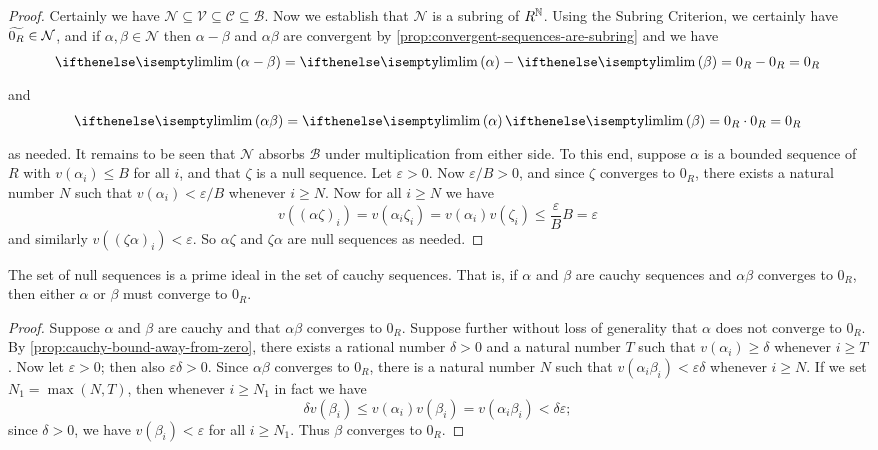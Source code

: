 \begin{proof}
Certainly we have \(\mathcal{N} \subseteq \mathcal{V} \subseteq \mathcal{C} \subseteq \mathcal{B}\).
Now we establish that \(\mathcal{N}\) is a subring of \(R^{\mathbb{N}}\).
Using the Subring Criterion, we certainly have \(\widetilde{0_R} \in \mathcal{N}\), and if \(\alpha,\beta \in \mathcal{N}\) then \(\alpha - \beta\) and \(\alpha\beta\) are convergent by \ref{prop:convergent-sequences-are-subring} and we have \[ \LIM{\alpha - \beta} = \LIM{\alpha} - \LIM{\beta} = 0_R - 0_R = 0_R \] and \[ \LIM{\alpha\beta} = \LIM{\alpha}\LIM{\beta} = 0_R \cdot 0_R = 0_R \] as needed.
It remains to be seen that \(\mathcal{N}\) absorbs \(\mathcal{B}\) under multiplication from either side.
To this end, suppose \(\alpha\) is a bounded sequence of \(R\) with \(v(\alpha_i) \leq B\) for all \(i\), and that \(\zeta\) is a null sequence.
Let \(\varepsilon > 0\).
Now \(\varepsilon/B > 0\), and since \(\zeta\) converges to \(0_R\), there exists a natural number \(N\) such that \(v(\alpha_i) < \varepsilon/B\) whenever \(i \geq N\).
Now for all \(i \geq N\) we have \[ v((\alpha\zeta)_i) = v(\alpha_i \zeta_i) = v(\alpha_i)v(\zeta_i) \leq \frac{\varepsilon}{B} B = \varepsilon \] and similarly \(v((\zeta\alpha)_i) < \varepsilon\).
So \(\alpha\zeta\) and \(\zeta\alpha\) are null sequences as needed.
\end{proof}

\begin{prop}
The set of null sequences is a prime ideal in the set of cauchy sequences.
That is, if \(\alpha\) and \(\beta\) are cauchy sequences and \(\alpha\beta\) converges to \(0_R\), then either \(\alpha\) or \(\beta\) must converge to \(0_R\).
\end{prop}

\begin{proof}
Suppose \(\alpha\) and \(\beta\) are cauchy and that \(\alpha\beta\) converges to \(0_R\).
Suppose further without loss of generality that \(\alpha\) does not converge to \(0_R\).
By \ref{prop:cauchy-bound-away-from-zero}, there exists a rational number \(\delta > 0\) and a natural number \(T\) such that \(v(\alpha_i) \geq \delta\) whenever \(i \geq T\).
Now let \(\varepsilon > 0\); then also \(\varepsilon\delta > 0\).
Since \(\alpha\beta\) converges to \(0_R\), there is a natural number \(N\) such that \(v(\alpha_i\beta_i) < \varepsilon\delta\) whenever \(i \geq N\).
If we set \(N_1 = \max(N, T)\), then whenever \(i \geq N_1\) in fact we have \[ \delta v(\beta_i) \leq v(\alpha_i)v(\beta_i) = v(\alpha_i\beta_i) < \delta\varepsilon; \] since \(\delta > 0\), we have \(v(\beta_i) < \varepsilon\) for all \(i \geq N_1\).
Thus \(\beta\) converges to \(0_R\).
\end{proof}

